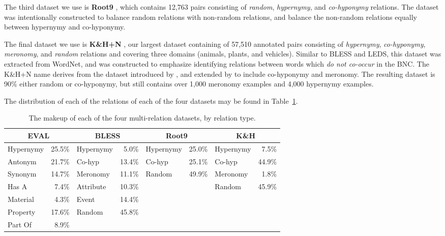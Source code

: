 The third dataset we use is {\bf Root9} \cite{santus:2016:lrec}, which contains
12,763 pairs consisting of {\em random}, {\em hypernymy}, and {\em co-hyponymy}
relations. The dataset was intentionally constructed to balance random
relations with non-random relations, and balance the non-random relations
equally between hypernymy and co-hyponymy.

The final dataset we use is {\bf K\&H+N} \cite{necsulescu:2015:starsem}, our
largest dataset containing of 57,510 annotated pairs consisting of {\em
hypernymy}, {\em co-hyponymy}, {\em meronomy}, and {\em random} relations and
covering three domains (animals, plants, and vehicles). Similar to BLESS and
LEDS, this dataset was extracted from WordNet, and was constructed to emphasize
identifying relations between words which {\em do not co-occur} in the BNC. The
K\&H+N name derives from the dataset introduced by ,
and extended by  to include co-hyponymy
and meronomy.  The resulting dataset is 90\% either random or co-hyponymy, but
still contains over 1,000 meronomy examples and 4,000 hypernymy examples.

The distribution of each of the relations of each of the four datasets may
be found in Table~\ref{tab:multimakeup}.

\begin{table}
\centering
\begin{footnotesize}
\begin{tabular}{|lr|lr|lr|lr|}
  \hline
  \multicolumn{2}{|c|}{{\bf EVAL}} & \multicolumn{2}{c|}{{\bf BLESS}} & \multicolumn{2}{c|}{{\bf Root9}} & \multicolumn{2}{c|}{{\bf K\&H}}\\
  \hline
  \hline
  Hypernymy & 25.5\% & Hypernymy   &  5.0\% & Hypernymy   & 25.0\% & Hypernymy   &  7.5\% \\
  Antonym   & 21.7\% & Co-hyp      & 13.4\% & Co-hyp      & 25.1\% & Co-hyp      & 44.9\% \\
  Synonym   & 14.7\% & Meronomy    & 11.1\% & Random      & 49.9\% & Meronomy    &  1.8\% \\
  Has A     &  7.4\% & Attribute   & 10.3\% &             &        & Random      & 45.9\% \\
  Material  &  4.3\% & Event       & 14.4\% &             &        &             &        \\
  Property  & 17.6\% & Random      & 45.8\% &             &        &             &        \\
  Part Of   &  8.9\% &             &        &             &        &             &        \\
  \hline
\end{tabular}
\end{footnotesize}
\caption{The makeup of each of the four multi-relation datasets, by relation type.}
\label{tab:multimakeup}
\end{table}

